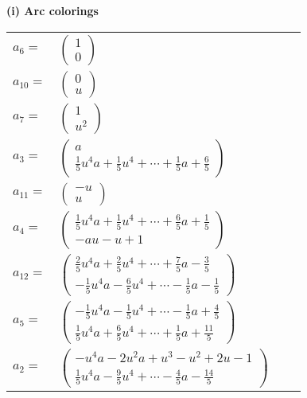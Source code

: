 \documentclass[1p]{elsarticle_modified}
\theoremstyle{definition}
\begin{document}
\flushleft \textbf{(i) Arc colorings}\\
\begin{tabular}{m{7pt} m{180pt} m{7pt} m{180pt} }
\flushright $a_{6}=$&$\begin{pmatrix}1\\0\end{pmatrix}$ \\
\flushright $a_{10}=$&$\begin{pmatrix}0\\u\end{pmatrix}$ \\
\flushright $a_{7}=$&$\begin{pmatrix}1\\u^2\end{pmatrix}$ \\
\flushright $a_{3}=$&$\begin{pmatrix}a\\\frac{1}{5} u^4 a+\frac{1}{5} u^4+\cdots+\frac{1}{5} a+\frac{6}{5}\end{pmatrix}$ \\
\flushright $a_{11}=$&$\begin{pmatrix}- u\\u\end{pmatrix}$ \\
\flushright $a_{4}=$&$\begin{pmatrix}\frac{1}{5} u^4 a+\frac{1}{5} u^4+\cdots+\frac{6}{5} a+\frac{1}{5}\\- a u- u+1\end{pmatrix}$ \\
\flushright $a_{12}=$&$\begin{pmatrix}\frac{2}{5} u^4 a+\frac{2}{5} u^4+\cdots+\frac{7}{5} a-\frac{3}{5}\\-\frac{1}{5} u^4 a-\frac{6}{5} u^4+\cdots-\frac{1}{5} a-\frac{1}{5}\end{pmatrix}$ \\
\flushright $a_{5}=$&$\begin{pmatrix}-\frac{1}{5} u^4 a-\frac{1}{5} u^4+\cdots-\frac{1}{5} a+\frac{4}{5}\\\frac{1}{5} u^4 a+\frac{6}{5} u^4+\cdots+\frac{1}{5} a+\frac{11}{5}\end{pmatrix}$ \\
\flushright $a_{2}=$&$\begin{pmatrix}- u^4 a-2 u^2 a+u^3- u^2+2 u-1\\\frac{1}{5} u^4 a-\frac{9}{5} u^4+\cdots-\frac{4}{5} a-\frac{14}{5}\end{pmatrix}$ \\

\end{tabular}
\end{document}
